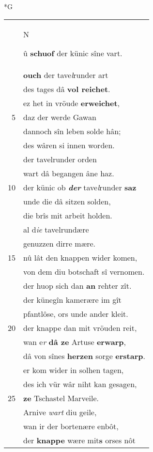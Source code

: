 \documentclass[8pt,a4paper,notitlepage]{article}
\begin{document}
\begin{table}[ht]
\begin{minipage}[t]{0.5\linewidth}
\small
\begin{center}*G
\end{center}
\begin{tabular}{rl}
 & \begin{large}N\end{large}û \textbf{schuof} der künic sîne vart.\\ 
 & \textbf{ouch} der tave\textit{l}runder art\\ 
 & des tages dâ \textbf{vol reichet}.\\ 
 & ez het in vröude \textbf{erweichet},\\ 
5 & daz der werde Gawan\\ 
 & dannoch sîn leben solde hân;\\ 
 & des wâren si innen worden.\\ 
 & der tavelrunder orden\\ 
 & wart dâ begangen âne haz.\\ 
10 & der künic ob \textit{\textbf{der}} tave\textit{l}runder \textbf{saz}\\ 
 & unde die dâ sitzen solden,\\ 
 & die brîs mit arbeit holden.\\ 
 & al d\textit{ie} tavelrundære\\ 
 & genuzzen dirre mære.\\ 
15 & nû lât den knappen wider komen,\\ 
 & von dem diu botschaft sî vernomen.\\ 
 & der huop sich dan \textbf{an} rehter zît.\\ 
 & der künegîn kamerære im gît\\ 
 & pfantlôse, ors unde ander kleit.\\ 
20 & der knappe dan mit vröuden reit,\\ 
 & wan e\textit{r} \textbf{dâ ze} Artuse \textbf{erwarp},\\ 
 & dâ von sînes \textbf{herzen} sorge \textbf{erstarp}.\\ 
 & er kom wider in solhen tagen,\\ 
 & des ich vür wâr niht kan gesagen,\\ 
25 & \textbf{ze} Tschastel Marveile.\\ 
 & Arnive \textit{wart} diu geile,\\ 
 & wan ir der bortenære enbôt,\\ 
 & der \textbf{knappe} wære mit\textbf{s} orses nôt\\ 

\end{tabular}
\end{minipage}
\end{table}
\end{document}
